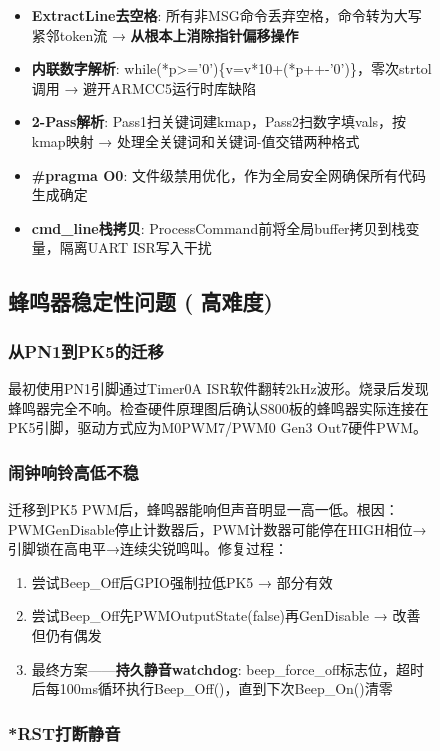 \documentclass[12pt,hyperref,a4paper,UTF8]{ctexart}
\begin{document}
\begin{figure}[!htbp]
\begin{itemize}
    \item \textbf{ExtractLine去空格}: 所有非MSG命令丢弃空格，命令转为大写紧邻token流 → \textbf{从根本上消除指针偏移操作}
    \item \textbf{内联数字解析}: while(*p>='0')\{v=v*10+(*p++-'0')\}，零次strtol调用 → 避开ARMCC5运行时库缺陷
    \item \textbf{2-Pass解析}: Pass1扫关键词建kmap，Pass2扫数字填vals，按kmap映射 → 处理全关键词和关键词-值交错两种格式
    \item \textbf{\#pragma O0}: 文件级禁用优化，作为全局安全网确保所有代码生成确定
    \item \textbf{cmd\_line栈拷贝}: ProcessCommand前将全局buffer拷贝到栈变量，隔离UART ISR写入干扰
\end{itemize}

\subsection{蜂鸣器稳定性问题 \qquad (\faStar\,\faStar\,\faStar 高难度)}

\subsubsection{从PN1到PK5的迁移}

最初使用PN1引脚通过Timer0A ISR软件翻转2kHz波形。烧录后发现蜂鸣器完全不响。检查硬件原理图后确认S800板的蜂鸣器实际连接在PK5引脚，驱动方式应为M0PWM7/PWM0 Gen3 Out7硬件PWM。

\subsubsection{闹钟响铃高低不稳}

迁移到PK5 PWM后，蜂鸣器能响但声音明显一高一低。根因：PWMGenDisable停止计数器后，PWM计数器可能停在HIGH相位→引脚锁在高电平→连续尖锐鸣叫。修复过程：

\begin{enumerate}
    \item 尝试Beep\_Off后GPIO强制拉低PK5 → 部分有效
    \item 尝试Beep\_Off先PWMOutputState(false)再GenDisable → 改善但仍有偶发
    \item 最终方案——\textbf{持久静音watchdog}: beep\_force\_off标志位，超时后每100ms循环执行Beep\_Off()，直到下次Beep\_On()清零
\end{enumerate}

\subsubsection{*RST打断静音}


\end{figure}
\end{document}
